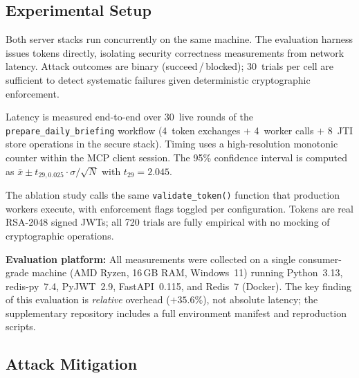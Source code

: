 \documentclass[journal]{IEEEtran}
\theoremstyle{definition}
\begin{document}
\subsection{Experimental Setup}

Both server stacks run concurrently on the same machine. The evaluation harness
issues tokens directly, isolating security correctness measurements from network
latency. Attack outcomes are binary (succeed\,/\,blocked); 30~trials per cell
are sufficient to detect systematic failures given deterministic cryptographic
enforcement.

Latency is measured end-to-end over 30~live rounds of the
\texttt{prepare\_daily\_\allowbreak briefing} workflow (4~token exchanges $+$ 4~worker
calls $+$ 8~JTI store operations in the secure stack). Timing uses a
high-resolution monotonic counter within the MCP client session. The 95\%
confidence interval is computed as
$\bar{x} \pm t_{29,0.025} \cdot \sigma/\sqrt{N}$ with $t_{29} = 2.045$.

The ablation study calls the same \texttt{validate\_token()} function that
production workers execute, with enforcement flags toggled per configuration.
Tokens are real RSA-2048 signed JWTs; all 720 trials are fully empirical with
no mocking of cryptographic operations.

\textbf{Evaluation platform:} All measurements were collected on a single
consumer-grade machine (AMD Ryzen, 16\,GB RAM, Windows~11) running
Python~3.13, redis-py~7.4, PyJWT~2.9, FastAPI~0.115, and Redis~7 (Docker).
The key finding of this evaluation is \textit{relative} overhead
($+35.6\%$), not absolute latency; the supplementary repository includes a
full environment manifest and reproduction scripts.

\subsection{Attack Mitigation}

\begin{table}[h]
\caption{Attack mitigation results ($N=30$ per cell)}
\label{tab:attacks}
\centering
\footnotesize
\setlength{\tabcolsep}{3pt}
\end{table}
\end{document}
